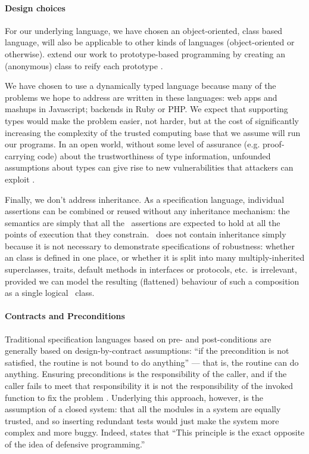 
\paragraph{Design choices}

For our underlying language, we have chosen an object-oriented, class based language,
 will also be
applicable to other kinds of languages (object-oriented or
otherwise).
 extend our work to prototype-based programming
by creating an (anonymous) class to reify each
prototype \cite{graceClasses}. 

We have chosen to use a dynamically typed language because many of the
problems we hope to address are written in these
languages: web apps and mashups in Javascript; backends in Ruby or
PHP.  We expect that supporting types would make the problem easier,
not harder, but at the cost of significantly increasing the complexity
of the trusted computing base that we assume will run our programs. In
an open world, without some level of assurance (e.g. proof-carrying
code) about the trustworthiness of type information, unfounded
assumptions about types can give rise to new vulnerabilities that
attackers can exploit \cite{pickles}.

Finally, we don't address inheritance. As a specification language,
individual \Chainmail assertions can be combined or reused without any
inheritance mechanism: the semantics are simply that all
the \Chainmail\ assertions are expected to hold at all the points of
execution that they constrain.  \LangOO\ does not contain inheritance
simply because it is not necessary to demonstrate specifications of
robustness: whether an \LangOO class is defined in one place, or
whether it is split into many multiply-inherited superclasses, traits,
default methods in interfaces or protocols, etc.\ is irrelevant,
provided we can model the resulting (flattened) behaviour of such a
composition as a single logical \LangOO\ class.

\paragraph{Contracts and Preconditions}

Traditional specification languages based on pre- and post-conditions
are generally based on design-by-contract assumptions: ``if the
precondition is not satisfied, the routine is not bound to do
anything'' \cite{meyer92dbc} --- that is, the routine can do
anything. Ensuring preconditions is the responsibility of the caller,
and if the caller fails to meet that responsibility it is not the
responsibility of the invoked function to fix the problem \cite{Mey88}.
Underlying this approach, however, is the assumption of a closed
system: that all the modules in a system are equally trusted, and so
inserting redundant tests would just make the system more complex and
more buggy. Indeed, \citet{meyer92dbc} states that ``This principle is
the exact opposite of the idea of defensive programming.''

